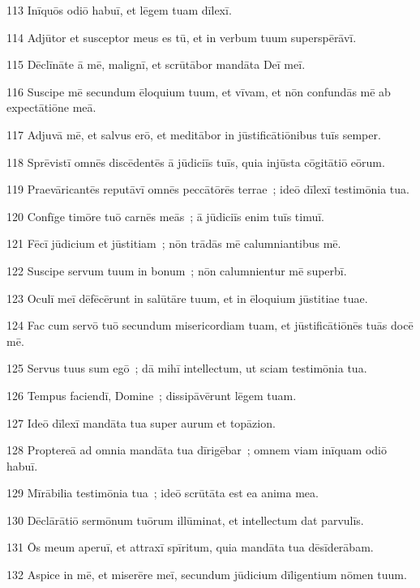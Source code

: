 \psalmVerse
  {113}
  {Inīquōs odiō habuī, et lēgem tuam dīlexī.}


\psalmVerse
  {114}
  {Adjūtor et susceptor meus es tū, et in verbum tuum superspērāvī.}


\psalmVerse
  {115}
  {Dēclīnāte ā mē, malignī, et scrūtābor mandāta Deī meī.}


\psalmVerse
  {116}
  {Suscipe mē secundum ēloquium tuum, et vīvam, et nōn confundās mē ab expectātiōne meā.}


\psalmVerse
  {117}
  {Adjuvā mē, et salvus erō, et meditābor in jūstificātiōnibus tuīs semper.}


\psalmVerse
  {118}
  {Sprēvistī omnēs discēdentēs ā jūdiciīs tuīs, quia injūsta cōgitātiō eōrum.}


\psalmVerse
  {119}
  {Praevāricantēs reputāvī omnēs peccātōrēs terrae~; ideō dīlexī testimōnia tua.}


\psalmVerse
  {120}
  {Confīge timōre tuō carnēs meās~; ā jūdiciīs enim tuīs timuī.}


\psalmVerse
  {121}
  {Fēcī jūdicium et jūstitiam~; nōn trādās mē calumniantibus mē.}


\psalmVerse
  {122}
  {Suscipe servum tuum in bonum~; nōn calumnientur mē superbī.}


\psalmVerse
  {123}
  {Oculī meī dēfēcērunt in salūtāre tuum, et in ēloquium jūstitiae tuae.}


\psalmVerse
  {124}
  {Fac cum servō tuō secundum misericordiam tuam, et jūstificātiōnēs tuās docē mē.}


\psalmVerse
  {125}
  {Servus tuus sum egō~; dā mihī intellectum, ut sciam testimōnia tua.}


\psalmVerse
  {126}
  {Tempus faciendī, Domine~; dissipāvērunt lēgem tuam.}


\psalmVerse
  {127}
  {Ideō dīlexī mandāta tua super aurum et topāzion.}


\psalmVerse
  {128}
  {Proptereā ad omnia mandāta tua dīrigēbar~; omnem viam inīquam odiō habuī.}


\psalmVerse
  {129}
  {Mīrābilia testimōnia tua~; ideō scrūtāta est ea anima mea.}


\psalmVerse
  {130}
  {Dēclārātiō sermōnum tuōrum illūminat, et intellectum dat parvulīs.}


\psalmVerse
  {131}
  {Ōs meum aperuī, et attraxī spīritum, quia mandāta tua dēsīderābam.}



\psalmVerse
  {132}
  {Aspice in mē, et miserēre meī, secundum jūdicium dīligentium nōmen tuum.}


